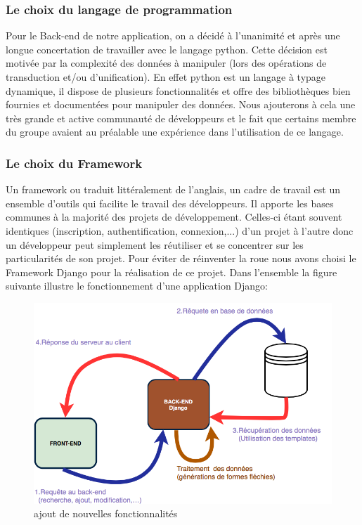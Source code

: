 \documentclass[a4paper, 12pt]{article}
\begin{document}
\subsubsection{Le choix du langage de programmation}
Pour le Back-end de notre application, on a décidé à l'unanimité et après une longue concertation de travailler avec le langage python. Cette décision est motivée par la complexité des données à manipuler (lors des opérations de transduction et/ou d'unification). En effet python est un langage à typage dynamique, il dispose de plusieurs fonctionnalités et offre des bibliothèques bien fournies et documentées pour manipuler des données. Nous ajouterons à cela une très grande et active communauté de développeurs et le fait que certains membre du groupe avaient au préalable une expérience dans l'utilisation de ce langage.  
\subsubsection{Le choix du Framework}
Un framework ou traduit littéralement de l'anglais, un cadre de travail est un ensemble d'outils qui facilite le travail des développeurs. Il apporte les bases communes à la majorité des projets de développement. Celles-ci étant souvent identiques (inscription, authentification, connexion,...) d'un projet à l'autre donc un développeur peut simplement les réutiliser et se concentrer sur les particularités de son projet. Pour éviter de réinventer la roue nous avons choisi le Framework Django pour la réalisation de ce projet. Dans l'ensemble la figure suivante illustre le fonctionnement d'une application Django:
 \begin{figure}[H] 
    \centering
    \includegraphics[scale=0.65]{fct.png}
    \caption{ajout de nouvelles fonctionnalités }
    \end{figure}
\end{document}
